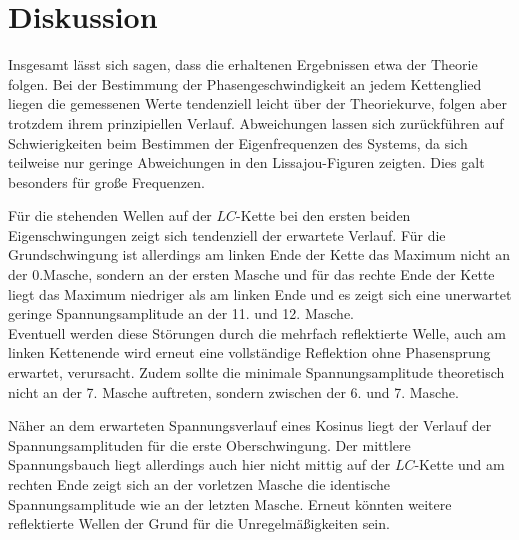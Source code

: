 \section{Diskussion}
\label{sec:Diskussion}
Insgesamt lässt sich sagen, dass die erhaltenen Ergebnissen etwa der Theorie folgen.
Bei der Bestimmung der Phasengeschwindigkeit an jedem Kettenglied liegen die gemessenen Werte tendenziell leicht über der Theoriekurve, folgen aber trotzdem ihrem prinzipiellen Verlauf.
Abweichungen lassen sich  zurückführen auf Schwierigkeiten beim Bestimmen der Eigenfrequenzen des Systems, da sich teilweise nur geringe Abweichungen in den Lissajou-Figuren zeigten.
Dies galt besonders für große Frequenzen.

Für die stehenden Wellen auf der $LC$-Kette bei den ersten beiden Eigenschwingungen zeigt sich tendenziell der erwartete Verlauf.
Für die Grundschwingung ist allerdings am linken Ende der Kette das Maximum nicht an der 0.Masche, sondern an der ersten Masche und für das rechte Ende der Kette liegt das Maximum niedriger als am linken Ende und es zeigt sich eine unerwartet geringe Spannungsamplitude an der 11. und 12. Masche.\\
Eventuell werden diese Störungen durch die mehrfach reflektierte Welle, auch am linken Kettenende wird erneut eine vollständige Reflektion ohne Phasensprung erwartet, verursacht.
Zudem sollte die minimale Spannungsamplitude theoretisch nicht an der 7. Masche auftreten, sondern zwischen der 6. und 7. Masche.

Näher an dem erwarteten Spannungsverlauf eines Kosinus liegt der Verlauf der Spannungsamplituden für die erste Oberschwingung.
Der mittlere Spannungsbauch liegt allerdings auch hier nicht mittig auf der $LC$-Kette und am rechten Ende zeigt sich an der vorletzen Masche die identische Spannungsamplitude wie an der letzten Masche.
Erneut könnten weitere reflektierte Wellen der Grund für die Unregelmäßigkeiten sein.
